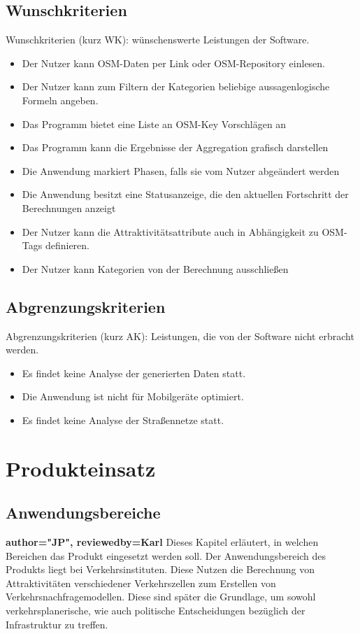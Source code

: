 \documentclass[parskip=full]{scrartcl} %
\begin{document}
\subsection{Wunschkriterien}
Wunschkriterien (kurz WK): wünschenswerte Leistungen der Software.
\begin{itemize}
    \item <WK1> Der Nutzer kann OSM-Daten per Link oder OSM-Repository einlesen.
    \item <WK2> Der Nutzer kann zum Filtern der Kategorien beliebige aussagenlogische Formeln angeben.
    \item <WK3> Das Programm bietet eine Liste an OSM-Key Vorschlägen an
    \item <WK4> Das Programm kann die Ergebnisse der Aggregation grafisch darstellen
    \item <WK5> Die Anwendung markiert Phasen, falls sie vom Nutzer abgeändert werden
    \item <WK6> Die Anwendung besitzt eine Statusanzeige, die den aktuellen Fortschritt der Berechnungen anzeigt
    \item <WK7> Der Nutzer kann die Attraktivitätsattribute auch in Abhängigkeit zu OSM-Tags definieren.
    \item <WK8> Der Nutzer kann Kategorien von der Berechnung ausschließen
    
\end{itemize}

\subsection{Abgrenzungskriterien}
Abgrenzungskriterien (kurz AK): Leistungen, die von der Software nicht erbracht werden.
\begin{itemize}
    \item <AK1> Es findet keine Analyse der generierten Daten statt.
    \item <AK2> Die Anwendung ist nicht für Mobilgeräte optimiert.
    \item <AK3> Es findet keine Analyse der Straßennetze statt.
\end{itemize}
\newpage

\section{Produkteinsatz}

\subsection{Anwendungsbereiche}
\textbf{author="JP", reviewedby=Karl} 
Dieses Kapitel erläutert, in welchen Bereichen das Produkt eingesetzt werden soll. Der Anwendungsbereich des Produkts liegt bei Verkehrsinstituten. Diese Nutzen die Berechnung von Attraktivitäten verschiedener Verkehrszellen zum Erstellen von Verkehrsnachfragemodellen. Diese sind später die Grundlage, um sowohl verkehrsplanerische, wie auch politische Entscheidungen bezüglich der Infrastruktur zu treffen.
\end{document}
